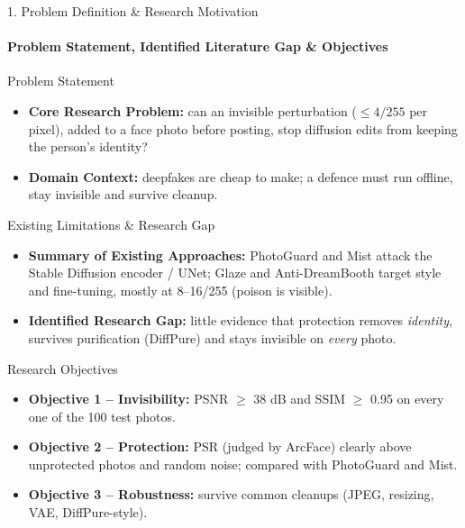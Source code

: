 \documentclass[aspectratio=169, 11pt]{beamer}
\begin{document}
\begin{frame}{1. Problem Definition \& Research Motivation}
    \framesubtitle{Problem Statement, Identified Literature Gap \& Objectives}
    \begin{block}{Problem Statement}
        \scriptsize
        \begin{itemize}
            \item \textbf{Core Research Problem:} can an invisible perturbation ($\le 4/255$ per pixel), added to a face photo before posting, stop diffusion edits from keeping the person's identity?
            \item \textbf{Domain Context:} deepfakes are cheap to make; a defence must run offline, stay invisible and survive cleanup.
        \end{itemize}
    \end{block}
    \vspace{-4pt}
    \begin{block}{Existing Limitations \& Research Gap}
        \scriptsize
        \begin{itemize}
            \item \textbf{Summary of Existing Approaches:} PhotoGuard and Mist attack the Stable Diffusion encoder / UNet; Glaze and Anti-DreamBooth target style and fine-tuning, mostly at 8--16/255 (poison is visible).
            \item \textbf{Identified Research Gap:} little evidence that protection removes \emph{identity}, survives purification (DiffPure) and stays invisible on \emph{every} photo.
        \end{itemize}
    \end{block}
    \vspace{-4pt}
    \begin{block}{Research Objectives}
        \scriptsize
        \begin{itemize}
            \item \textbf{Objective 1 -- Invisibility:} PSNR $\ge$ 38 dB and SSIM $\ge$ 0.95 on every one of the 100 test photos.
            \item \textbf{Objective 2 -- Protection:} PSR (judged by ArcFace) clearly above unprotected photos and random noise; compared with PhotoGuard and Mist.
            \item \textbf{Objective 3 -- Robustness:} survive common cleanups (JPEG, resizing, VAE, DiffPure-style).
        \end{itemize}
    \end{block}
\end{frame}
\end{document}
